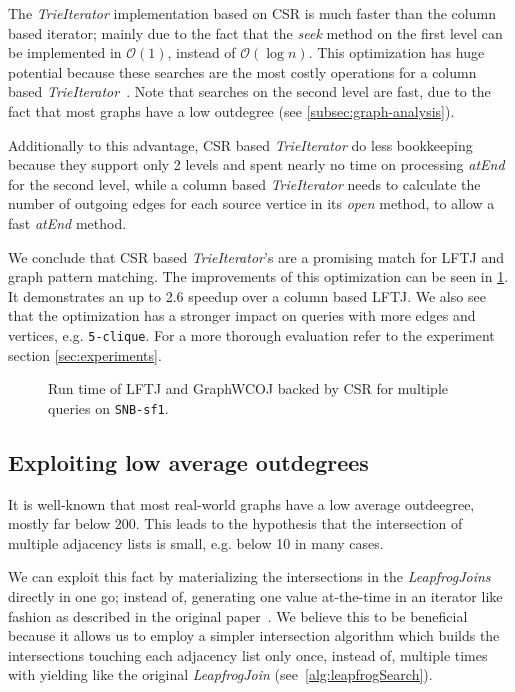 The \textit{TrieIterator} implementation based on \textsc{CSR} is much faster than the column based iterator; mainly due to the fact
that the \textit{seek} method on the first level can be implemented in $\mathcal{O}(1)$, instead of $\mathcal{O}(\log n)$.
This optimization has huge potential because these searches are the most costly operations for a column based
\textit{TrieIterator}~\cite{myria-detailed}.
Note that searches on the second level are fast, due to the fact that most graphs have a low outdegree (see
\cref{subsec:graph-analysis}).

Additionally to this advantage, \textsc{CSR} based \textit{TrieIterator} do less bookkeeping because they support only 2 levels and spent
nearly no time on processing \textit{atEnd} for the second level, while a column based \textit{TrieIterator} needs to calculate the
number of outgoing edges for each source vertice in its \textit{open} method, to allow a fast \textit{atEnd} method.

We conclude that \textsc{CSR} based \textit{TrieIterator}'s are a promising match for \textsc{LFTJ} and graph pattern matching.
The improvements of this optimization can be seen in \cref{fig:wcoj-vs-graphWCOJ}.
It demonstrates an up to 2.6 speedup over a column based \textsc{LFTJ}. %
We also see that the optimization has a stronger impact on queries with more edges and vertices, e.g. \texttt{5-clique}.
For a more thorough evaluation refer to the experiment section \ref{sec:experiments}.

\begin{figure}
\centering

\caption{Run time of \textsc{LFTJ} and GraphWCOJ backed by \textsc{CSR} for multiple queries on \texttt{SNB-sf1}.}
\label{fig:wcoj-vs-graphWCOJ}
\end{figure}

\subsection{Exploiting low average outdegrees} \label{subsec:graphWCOJ-materalization}

It is well-known that most real-world graphs have a low average outdeegree, mostly far below 200.
This leads to the hypothesis that the intersection of multiple adjacency lists is small, e.g. below 10 in many cases.

We can exploit this fact by materializing the intersections in the \textit{LeapfrogJoins} directly
in one go; instead of, generating one value at-the-time in an iterator like fashion as described in the
original paper~\cite{lftj}.
We believe this to be beneficial because it allows us to employ a simpler intersection algorithm which builds
the intersections touching each adjacency list only once, instead of, multiple times with yielding like the original
\textit{LeapfrogJoin} (see~\cref{alg:leapfrogSearch}).

